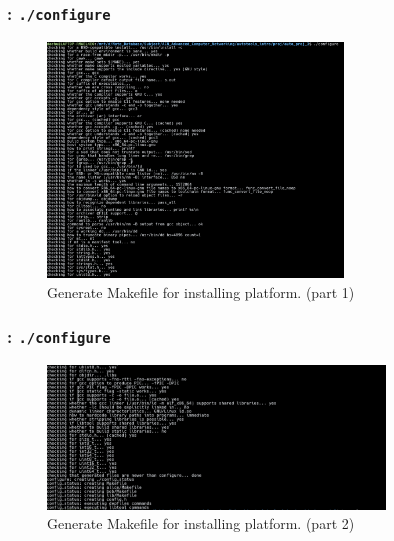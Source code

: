 \begin{frame}
    \frametitle{: \texttt{./configure}}

    \begin{figure}[H]
        \centering
        \includegraphics[width=0.7\textwidth]{../figure/autotool_3.png}
        \caption*{Generate Makefile for installing platform. (part 1)}
    \end{figure}
\end{frame}

\begin{frame}
    \frametitle{: \texttt{./configure}}

    \begin{figure}[H]
        \centering
        \includegraphics[width=0.8\textwidth]{../figure/autotool_4.png}
        \caption*{Generate Makefile for installing platform. (part 2)}
    \end{figure}
\end{frame}

